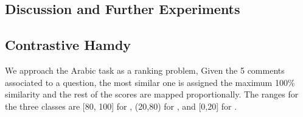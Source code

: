 \subsection{Discussion and Further Experiments} \label{sec:expdiscussion}


% 
% 
% 
% 


% 
%  
%  
%  



\subsection{Contrastive Hamdy}
\label{tmp}

We approach the Arabic task as a ranking problem, Given the 5 comments 
associated to a question, the most similar one is assigned the maximum 100\% 
similarity and the rest of the scores are mapped proportionally. The ranges 
for the three classes are [80, 100] for \dir, (20,80) for \rel, and [0,20] 
for \irel.

